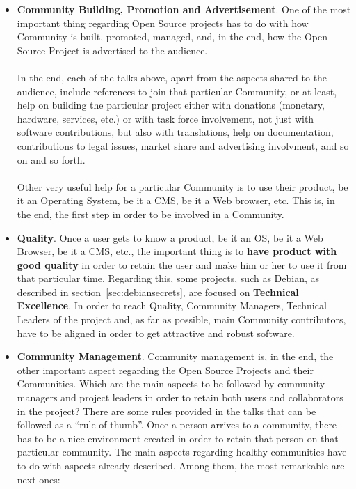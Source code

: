 \documentclass[11pt]{article}
\begin{document}
\begin{itemize}
\item{\textbf{Community Building, Promotion and Advertisement}}. One of the most important thing regarding Open Source projects has to do with how Community is built, promoted, managed, and, in the end, how the Open Source Project is advertised to the audience.\\
\\
In the end, each of the talks above, apart from the aspects shared to the audience, include references to join that particular Community, or at least, help on building the particular project either with donations (monetary, hardware, services, etc.) or with task force involvement, not just with software contributions, but also with translations, help on documentation, contributions to legal issues, market share and advertising involvment, and so on and so forth.\\
\\
Other very useful help for a particular Community is to use their product, be it an Operating System, be it a CMS, be it a Web browser, etc. This is, in the end, the first step in order to be involved in a Community.
\item{\textbf{Quality}}. Once a user gets to know a product, be it an OS, be it a Web Browser, be it a CMS, etc., the important thing is to \textbf{have product with good quality} in order to retain the user and make him or her to use it from that particular time. Regarding this, some projects, such as Debian, as described in section~\ref{sec:debiansecrets}, are focused on \textbf{Technical Excellence}. In order to reach Quality, Community Managers, Technical Leaders of the project and, as far as possible, main Community contributors, have to be aligned in order to get attractive and robust software.
\item{\textbf{Community Management}}. Community management is, in the end, the other important aspect regarding the Open Source Projects and their Communities. Which are the main aspects to be followed by community managers and project leaders in order to retain both users and collaborators in the project? There are some rules provided in the talks that can be followed as a ``rule of thumb''. Once a person arrives to a community, there has to be a nice environment created in order to retain that person on that particular community. The main aspects regarding healthy communities have to do with aspects already described. Among them, the most remarkable are next ones:
\begin{itemize}\itemsep0pt

\end{itemize}
\end{itemize}
\end{document}
